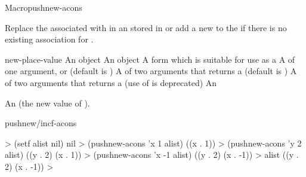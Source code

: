 \documentclass[10pt,twoside,english,pdftex]{article}
\begin{document}
\begin{functiondoc}{Macro}{pushnew-acons}{ 
     
    \returns{} } 
%
%
%
%
  
\fnsyntax

\fnpurpose Replace the  associated with  in an
 stored in  or add a new
  to the
   if there is no existing association for .

\fnpackage {}

\fnmodule {}

\fnargs
\begin{args}{new-place-value}
\arg[item] An object
\arg[value] An object
\arg[place] A form which is suitable for use as a
\arg[key] A  of one argument, or \nil{} (default is \nil)
\arg[test] A  of two arguments that returns a
 (default is ) 
 A  of two arguments that returns a
 (use of  is deprecated)
 An 
\end{args}

\fnreturns An  (the new value of
). 

\begin{alsos}{pushnew/incf-acons}
\end{alsos}

\fnexamples
%
\W\supp
\begin{example}
  > (setf alist nil)
  nil
  > (pushnew-acons 'x 1 alist)
  ((x . 1))
  > (pushnew-acons 'y 2 alist)
  ((y . 2) (x . 1))\goodpagebreak
  > (pushnew-acons 'x -1 alist)
  ((y . 2) (x . -1))
  > alist
  ((y . 2) (x . -1))
  >
\end{example}

\end{functiondoc}

\end{document}
